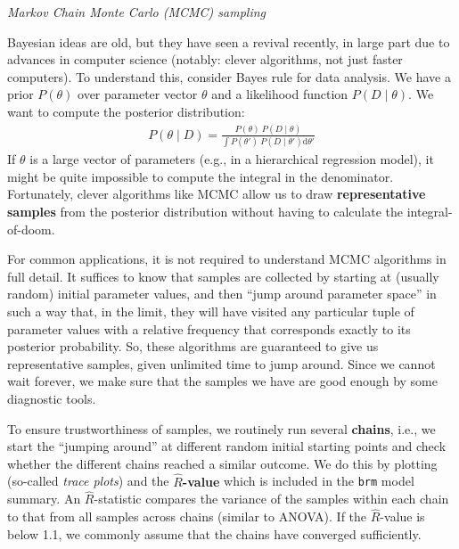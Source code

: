 \documentclass[nobib]{tufte-handout}
\begin{document}
\begin{InfoBox}[]
\centering
\colorbox{mygray}{\centering
  \begin{minipage}{1\textwidth}

    \emph{Markov Chain Monte Carlo (MCMC) sampling}
    \medskip
 
    Bayesian ideas are old, but they have seen a revival recently, in large part due to
    advances in computer science (notably: clever algorithms, not just faster computers). To
    understand this, consider Bayes rule for data analysis. We have a prior $P(\theta)$ over
    parameter vector $\theta$ and a likelihood function $P(D\mid\theta)$. We want to compute
    the posterior distribution:
    \begin{eqnarray*}
      P(\theta \mid D) = \frac{P(\theta) \ P(D \mid \theta)}{ \int P(\theta') \ P(D \mid
      \theta') \textrm{d}\theta'}
    \end{eqnarray*}
    If $\theta$ is a large vector of parameters (e.g., in a hierarchical regression model), it
    might be quite impossible to compute the integral in the denominator. Fortunately, clever
    algorithms like MCMC allow us to draw \textbf{representative samples} from the
    posterior distribution without having to calculate the integral-of-doom.

    \medskip
    
    For common applications, it is not required to understand MCMC algorithms in full detail.
    It suffices to know that samples are collected by starting at (usually random) initial
    parameter values, and then ``jump around parameter space'' in such a way that, in the
    limit, they will have visited any particular tuple of parameter values with a relative
    frequency that corresponds exactly to its posterior probability. So, these algorithms are
    guaranteed to give us representative samples, given unlimited time to jump around. Since we
    cannot wait forever, we make sure that the samples we have are good enough by some
    diagnostic tools.

    \medskip
    
    To ensure trustworthiness of samples, we routinely run several \textbf{chains}, i.e., we
    start the ``jumping around'' at different random initial starting points and check whether
    the different chains reached a similar outcome. We do this by plotting (so-called
    \emph{trace plots}) and the \textbf{$\hat{R}$-value} which is included in the \texttt{brm}
    model summary. An $\hat{R}$-statistic compares the variance of the samples within each
    chain to that from all samples across chains (similar to ANOVA). If the $\hat{R}$-value is
    below 1.1, we commonly assume that the chains have converged sufficiently.


\end{minipage}}
\end{InfoBox}
\end{document}
